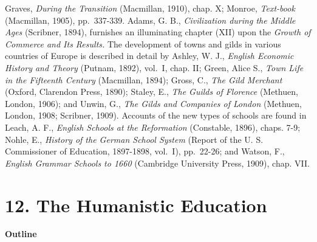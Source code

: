 \documentclass[]{book}
\begin{document}
Graves, \emph{During the Transition} (Macmillan, 1910), chap. X; Monroe, \emph{Text-book} (Macmillan, 1905), pp.~337-339. Adams, G. B., \emph{Civilization during the Middle Ages} (Scribner, 1894), furnishes an illuminating chapter (XII) upon the \emph{Growth of Commerce and Its Results.} The development of towns and gilds in various countries of Europe is described in detail by Ashley, W. J., \emph{English Economic History and Theory} (Putnam, 1892), vol.~I, chap. II; Green, Alice S., \emph{Town Life in the Fifteenth Century} (Macmillan, 1894); Gross, C., \emph{The Gild Merchant} (Oxford, Clarendon Press, 1890); Staley, E., \emph{The Guilds of Florence} (Methuen, London, 1906); and Unwin, G., \emph{The Gilds and Companies of London} (Methuen, London, 1908; Scribner, 1909). Accounts of the new types of schools are found in Leach, A. F., \emph{English Schools at the Reformation} (Constable, 1896), chaps. 7-9; Nohle, E., \emph{History of the German School System} (Report of the U. S. Commissioner of Education, 1897-1898, vol.~I), pp.~22-26; and Watson, F., \emph{English Grammar Schools to 1660} (Cambridge University Press, 1909), chap. VII.

\hypertarget{the-humanistic-education}{%
\chapter{12. The Humanistic Education}\label{the-humanistic-education}}

\textbf{Outline}
\end{document}
